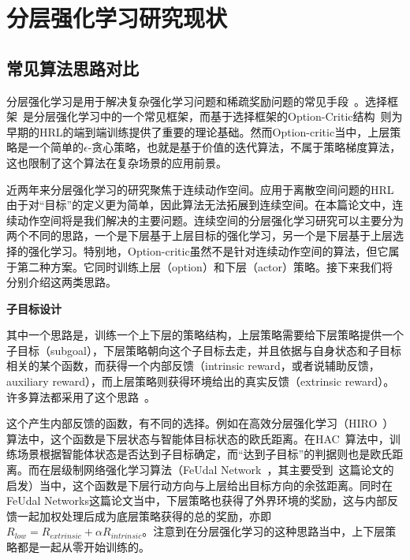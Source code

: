 \section{分层强化学习研究现状}
\subsection{常见算法思路对比}
分层强化学习是用于解决复杂强化学习问题和稀疏奖励问题的常见手段~\cite{Sutton:1999, HRL_with_maxQ, FUN, Barto_HRL}。选择框架~\cite{Sutton:1998_options, Sutton:1999}是分层强化学习中的一个常见框架，而基于选择框架的Option-Critic结构~\cite{option-critic}则为早期的HRL的端到端训练提供了重要的理论基础。然而Option-critic当中，上层策略是一个简单的$\epsilon$-贪心策略，也就是基于价值的迭代算法，不属于策略梯度算法，这也限制了这个算法在复杂场景的应用前景。

近两年来分层强化学习的研究聚焦于连续动作空间。应用于离散空间问题的HRL由于对``目标''的定义更为简单，因此算法无法拓展到连续空间。在本篇论文中，连续动作空间将是我们解决的主要问题。连续空间的分层强化学习研究可以主要分为两个不同的思路，一个是下层基于上层目标的强化学习，另一个是下层基于上层选择的强化学习。特别地，Option-critic虽然不是针对连续动作空间的算法，但它属于第二种方案。它同时训练上层（option）和下层（actor）策略。接下来我们将分别介绍这两类思路。

\textbf{子目标设计}

其中一个思路是，训练一个上下层的策略结构，上层策略需要给下层策略提供一个子目标（subgoal），下层策略朝向这个子目标去走，并且依据与自身状态和子目标相关的某个函数，而获得一个内部反馈（intrinsic reward，或者说辅助反馈，auxiliary reward），而上层策略则获得环境给出的真实反馈（extrinsic reward）。许多算法都采用了这个思路~\cite{Sutton:1999, Tenenbaum2016NIPS, HIRO, HAC, feudal}。

这个产生内部反馈的函数，有不同的选择。例如在高效分层强化学习（HIRO~\cite{HIRO}）算法中，这个函数是下层状态与智能体目标状态的欧氏距离。在HAC~\cite{HAC}算法中，训练场景根据智能体状态是否达到子目标确定，而``达到子目标''的判据则也是欧氏距离。而在层级制网络强化学习算法（FeUdal Network~\cite{feudal}，其主要受到~\cite{FUN}这篇论文的启发）当中，这个函数是下层行动方向与上层给出目标方向的余弦距离。同时在FeUdal Networks这篇论文当中，下层策略也获得了外界环境的奖励，这与内部反馈一起加权处理后成为底层策略获得的总的奖励，亦即$R_{low} = R_{extrinsic} + \alpha R_{intrinsic}$。注意到在分层强化学习的这种思路当中，上下层策略都是一起从零开始训练的。

